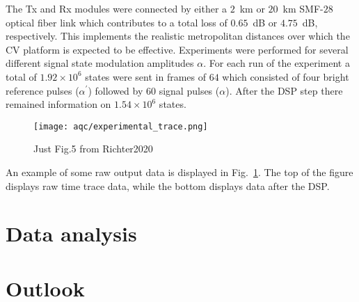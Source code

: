 The Tx and Rx modules were connected by either a $2$~km or $20$~km SMF-$28$ optical fiber link which contributes to a total loss of $0.65$~dB or $4.75$~dB, respectively. This implements the realistic metropolitan distances over which the CV platform is expected to be effective. Experiments were performed for several different signal state modulation amplitudes $\alpha$. For each run of the experiment a total of $1.92\times 10^6$ states were sent in frames of $64$ which consisted of four bright reference pulses ($\alpha^\prime$) followed by $60$ signal pulses ($\alpha$). After the DSP step there remained information on $1.54 \times 10^6$ states. 

\begin{figure}[htp]
\centering
\texttt{[image: aqc/experimental\_trace.png]}
\caption{\label{fig:aqc_experimental_trace} Just Fig.5 from Richter2020}
\end{figure}

An example of some raw output data is displayed in Fig.~\ref{fig:aqc_experimental_trace}. The top of the figure displays raw time trace data, while the bottom displays data after the DSP.

\section{Data analysis}


\section{Outlook}

